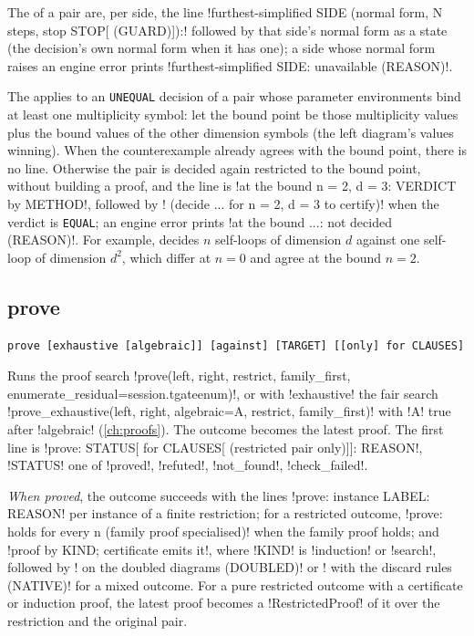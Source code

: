 The  of a pair are, per side, the line \code!furthest-simplified SIDE (normal form, N steps, stop STOP[ (GUARD)]):! followed by that side's normal form as a state (the decision's own normal form when it has one); a side whose normal form raises an engine error prints \code!furthest-simplified SIDE: unavailable (REASON)!.

The  applies to an \texttt{UNEQUAL} decision of a pair whose parameter environments bind at least one multiplicity symbol: let the bound point be those multiplicity values plus the bound values of the other dimension symbols (the left diagram's values winning). When the counterexample already agrees with the bound point, there is no line. Otherwise the pair is decided again restricted to the bound point, without building a proof, and the line is \code!at the bound n = 2, d = 3: VERDICT by METHOD!, followed by \code! (decide ... for n = 2, d = 3 to certify)! when the verdict is \texttt{EQUAL}; an engine error prints \code!at the bound ...: not decided (REASON)!. For example,  decides $n$ self-loops of dimension $d$ against one self-loop of dimension $d^2$, which differ at $n=0$ and agree at the bound $n=2$.

\subsection{prove}\label{sec:language-prove}

\begin{lstlisting}[style=azx]
prove [exhaustive [algebraic]] [against] [TARGET] [[only] for CLAUSES]
\end{lstlisting}
Runs the proof search \py!prove(left, right, restrict, family_first, enumerate_residual=session.tgateenum)!, or with \code!exhaustive! the fair search \py!prove_exhaustive(left, right, algebraic=A, restrict, family_first)! with \code!A! true after \code!algebraic! (\cref{ch:proofs}). The outcome becomes the latest proof. The first line is \code!prove: STATUS[ for CLAUSES[ (restricted pair only)]]: REASON!, \code!STATUS! one of \code!proved!, \code!refuted!, \code!not_found!, \code!check_failed!.

\emph{When proved}, the outcome succeeds with the lines \code!prove: instance LABEL: REASON! per instance of a finite restriction; for a restricted outcome, \code!prove: holds for every n (family proof specialised)! when the family proof holds; and \code!proof by KIND; certificate emits it!, where \code!KIND! is \code!induction! or \code!search!, followed by \code! on the doubled diagrams (DOUBLED)! or \code! with the discard rules (NATIVE)! for a mixed outcome. For a pure restricted outcome with a certificate or induction proof, the latest proof becomes a \py!RestrictedProof! of it over the restriction and the original pair.

